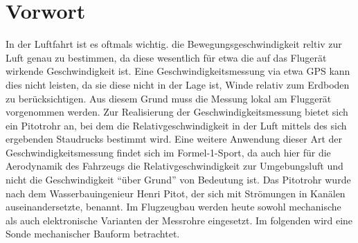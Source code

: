 \section{Vorwort}
In der Luftfahrt ist es oftmals wichtig. die Bewegungsgeschwindigkeit reltiv zur Luft genau zu bestimmen, da diese wesentlich 
für etwa die auf das Flugerät wirkende Geschwindigkeit ist. Eine Geschwindigkeitsmessung via etwa GPS kann dies nicht leisten, 
da sie diese nicht in der Lage ist, Winde relativ zum Erdboden zu berücksichtigen. Aus diesem Grund muss die Messung lokal am 
Fluggerät vorgenommen werden. Zur Realisierung der Geschwindigkeitsmessung bietet sich ein Pitotrohr an, bei dem die 
Relativgeschwindigkeit in der Luft mittels des sich ergebenden Staudrucks bestimmt wird. Eine weitere Anwendung dieser Art der 
Geschwindigkeitsmessung findet sich im Formel-1-Sport, da auch hier für die Aerodynamik des Fahrzeugs die Relativgeschwindigkeit 
zur Umgebungsluft und nicht die Geschwindigkeit \enquote{über Grund} von Bedeutung ist. 
Das Pitotrohr wurde nach dem Wasserbauingenieur Henri Pitot, der sich mit Strömungen in Kanälen auseinandersetzte, benannt.
Im Flugzeugbau werden heute sowohl mechanische als auch elektronische Varianten der Messrohre eingesetzt. Im folgenden wird eine Sonde mechanischer Bauform betrachtet.
